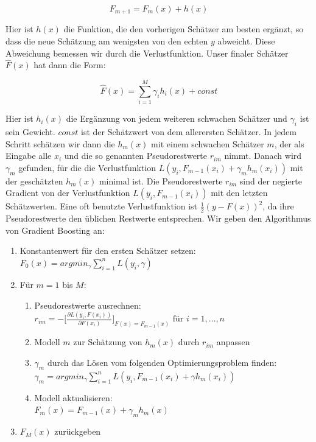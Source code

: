 \documentclass[12pt,a4paper,twoside]{scrartcl}
\numberwithin{equation}{section}
\begin{document}
\begin{equation}\label{eq:2.25}
	F_{m+1} = F_m(x) + h(x)
\end{equation} 

\noindent
Hier ist $h(x)$ die Funktion, die den vorherigen Schätzer am besten ergänzt, so dass die neue Schätzung am wenigsten von den echten $y$ abweicht. Diese Abweichung bemessen wir durch die Verlustfunktion. Unser finaler Schätzer $\hat F(x)$ hat dann die Form: \par 

\begin{equation}\label{eq:2.26}
	\hat F(x) = \sum_{i=1}^{M} \gamma_i h_i(x) + const
\end{equation} 

\noindent
Hier ist $h_i(x)$ die Ergänzung von jedem weiteren schwachen Schätzer und $\gamma_i$ ist sein Gewicht. $const$ ist der Schätzwert von dem allerersten Schätzer. In jedem Schritt schätzen wir dann die $h_m(x)$ mit einem schwachen Schätzer $m$, der als Eingabe alle $x_i$ und die so genannten Pseudorestwerte $r_{im}$ nimmt. Danach wird $\gamma_m$ gefunden, für die die Verlustfunktion $L(y_i,F_{m-1}(x_i)+\gamma_m h_m(x_i))$ mit der geschätzten $h_m(x)$ minimal ist. Die  Pseudorestwerte $r_{im}$ sind der negierte Gradient von der Verlustfunktion  $L(y_i,F_{m-1}(x_i))$ mit den letzten Schätzwerten. Eine oft benutzte Verlustfunktion ist $\frac{1}{2}(y-F(x))^2$, da ihre Pseudorestwerte den üblichen Restwerte entsprechen\cite{gradientBoost}. Wir geben den Algorithmus von Gradient Boosting an:\par 

\begin{enumerate}
\item Konstantenwert für den ersten Schätzer setzen:\\
$F_0(x) = argmin_{\gamma} \sum_{i=1}^n L(y_i,\gamma)$
\item Für $m = 1$ bis $M$:
\begin{enumerate}
\item Pseudorestwerte ausrechnen:\\
$r_{im} = - \big [ \frac{\partial L(y_i,F(x_i))}{\partial F(x_i)}\big ]_{F(x)=F_{m-1}(x)} \text{ für } i= 1,\dots,n $
\item Modell $m$ zur Schätzung von $h_m(x)$ durch $r_{im}$ anpassen
\item $\gamma_m$ durch das Lösen vom folgenden Optimierungsproblem finden:\\
$\gamma_m = argmin_{\gamma} \sum_{i=1}^n L(y_i,F_{m-1}(x_i)+\gamma h_m(x_i))$
\item Modell aktualisieren:\\
$F_m(x) = F_{m-1}(x) + \gamma_m h_m(x)$	
\end{enumerate}

\item $F_M(x)$ zurückgeben
\end{enumerate}
\end{document}
